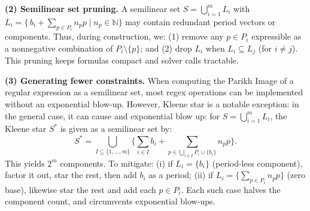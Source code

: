 
\medskip
\noindent
\textbf{(2) Semilinear set pruning.}  
A semilinear set $S=\bigcup_{i=1}^m L_i$ with 
	$L_i=\{\,b_i+\sum_{p\in P_i}n_p p \mid n_p\in\mathbb N\}$ may contain redundant 
	period vectors or components.  
	Thus, during construction, we:
	(1) remove any $p\in P_i$ expressible as a nonnegative combination of $P_i\setminus\{p\}$; 
	and (2) drop $L_i$ when $L_i\subseteq L_j$ (for \(i \neq j\)).  
	This pruning keeps formulas compact and solver calls tractable.






\medskip
\noindent
\textbf{(3) Generating fewer constraints.}  
When computing the Parikh Image of a regular expression as a semilinear set,
	most regex operations can be implemented without an exponential blow-up.
	However, Kleene star is a notable exception: in the general case, it can cause and exponential blow up: for $S=\bigcup_{i=1}^m L_i$,  the Kleene star $S^\ast$ is given as a semilinear set by: 
	\[
	S^\ast=\bigcup_{I \subseteq \{1,...,m\}} 
	\Big\{\sum_{i \in I} b_i + \sum_{p \in \bigcup_{i \in I} P_i\cup \{b_i\}} n_p p\Big\}.
	\]
	This yields $2^m$ components. To mitigate:
	(i) if $L_i=\{b_i\}$ (period-less component), factor it out, star the rest, then add $b_i$ as a period;  
	(ii) if $L_i=\{\sum_{p\in P_i}n_pp\}$ (zero base), likewise star the rest and add each $p\in P_i$.  
	Each such case halves the component count, and circumvents exponential blow-ups.





